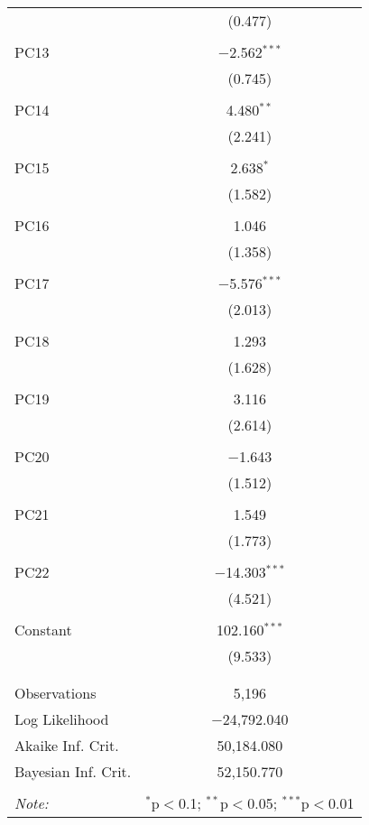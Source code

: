 \begin{table}[!htbp]
\begin{tabular}{@{\extracolsep{5pt}}lc}
  & (0.477) \\ 
  & \\ 
 PC13 & $-$2.562$^{***}$ \\ 
  & (0.745) \\ 
  & \\ 
 PC14 & 4.480$^{**}$ \\ 
  & (2.241) \\ 
  & \\ 
 PC15 & 2.638$^{*}$ \\ 
  & (1.582) \\ 
  & \\ 
 PC16 & 1.046 \\ 
  & (1.358) \\ 
  & \\ 
 PC17 & $-$5.576$^{***}$ \\ 
  & (2.013) \\ 
  & \\ 
 PC18 & 1.293 \\ 
  & (1.628) \\ 
  & \\ 
 PC19 & 3.116 \\ 
  & (2.614) \\ 
  & \\ 
 PC20 & $-$1.643 \\ 
  & (1.512) \\ 
  & \\ 
 PC21 & 1.549 \\ 
  & (1.773) \\ 
  & \\ 
 PC22 & $-$14.303$^{***}$ \\ 
  & (4.521) \\ 
  & \\ 
 Constant & 102.160$^{***}$ \\ 
  & (9.533) \\ 
  & \\ 
\hline \\[-1.8ex] 
Observations & 5,196 \\ 
Log Likelihood & $-$24,792.040 \\ 
Akaike Inf. Crit. & 50,184.080 \\ 
Bayesian Inf. Crit. & 52,150.770 \\ 
\hline 
\hline \\[-1.8ex] 
\textit{Note:}  & \multicolumn{1}{r}{$^{*}$p$<$0.1; $^{**}$p$<$0.05; $^{***}$p$<$0.01} \\ 
\end{tabular} 
\end{table} 
